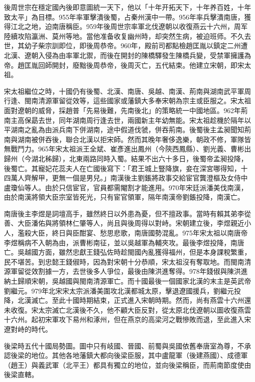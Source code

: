 後周世宗在穩定國內後即意圖統一天下，他以「十年开拓天下，十年养百姓，十年致太平」為目標。955年率軍擊潰後蜀，占秦州漢中一帶。956年率兵擊潰南唐，獲得江北之地，迫南唐稱臣。959年後周世宗率軍北伐遼朝以收復燕云十六州，周军陸續攻陷瀛洲、莫州等地。當他准备收复幽州時，却突然生病，被迫班师。不久去世，其幼子柴宗訓即位，即後周恭帝。960年，殿前司都點檢趙匡胤以鎮定二州遭北漢、遼朝入侵為由率軍北禦，而後在開封的陳橋驛發生陳橋兵變，受禁軍擁護為帝。趙匡胤回師開封，廢黜後周恭帝，後周灭亡，五代結束。他建立宋朝，即宋太祖。

宋太祖繼位之時，十國仍有後蜀、北漢、南唐、吳越、南漢、荊南與湖南武平軍周行逢、閩南清源軍留從效等，這些國家或藩鎮大多奉宋朝為宗主或臣服之。宋太祖面對遼朝的威脅，採趙普「先易後難，先南後北」的策略統一中國地區。962年荊南主高保勗去世，同年湖南周行逢去世，兩國新主年幼無能。宋太祖趁機於隔年以平湖南之亂為由派兵南下併湖南，途中假道伐虢，併吞荊南。後蜀後主孟昶聞知荊南與湖南被併吞後，聯合北漢以拒宋師。然而其晚年奢侈逸樂，朝政不修，軍隊皆無戰鬥力。965年宋太祖派王全斌、崔彥進出鳳州（今陝西鳳縣）、劉光義、曹彬出歸州（今湖北秭歸），北東兩路同時入蜀。結果不出六十多日，後蜀帝孟昶投降，後蜀亡。其寵妃花蕊夫人在亡國後寫下：「君王城上豎降旗，妾在深宮哪得知，十四萬人齊解甲，更無一個是男兒。」南漢後主劉鋹將政事交給宦官龔澄樞及女侍中盧瓊仙等人。由於只信宦官，官員都需閹割才能進用。970年宋廷派潘美伐南漢，由於南漢將領大臣宗室皆死光，只有宦官領軍，隔年南漢帝劉鋹投降，南漢亡。

南唐後主李煜是詞壇高手，雖然終日以外患為憂，但不擅政事。當時有賴其弟李從善、大臣潘佑與將領林仁肇等人，尚且與後周得以對峙。宋朝建立後，李煜親近小人，濫殺大臣，終日與臣酣宴、愁思悲歌，南唐國勢混亂。975年宋太祖以南唐帝李煜稱病不入朝為由，派曹彬南征，並以吳越軍為輔夾攻。最後李煜投降，南唐亡。吳越國方面，雖然忠獻王錢弘佐時趁閩國內亂獲得福州，但是本身課稅繁重，民不堪苦。到忠懿王錢俶時，因為對宋朝十分恭順，宋太祖沒有奪取地。而閩南清源軍留從效割據一方，去世後多人爭位，最後由陳洪進奪得。978年錢俶與陳洪進納土歸順宋朝，吳越國與閩南清源軍亡。而十國最後一個國家北漢的末主是英武帝劉繼元。979年北宋宋太宗派潘美圍攻北漢都城太原，擊退遼國援兵，劉繼元投降，北漢滅亡。至此十國時期結束，正式進入宋朝時期。然而，尚有燕雲十六州還未收復。宋太宗滅亡北漢後不久，他不顧大臣反對，從太原北伐遼朝以圖收復燕雲十六州。起初宋軍攻下易州和涿州，但在燕京的高梁河之戰慘敗而退，至此進入宋遼對峙的時代。

後梁時五代十國局勢圖。圖中只有岐國、晉國、前蜀與吳國依舊奉唐室為尊，不承認後梁的地位。其他各地藩鎮大都向後梁臣服，其中盧龍軍（後建燕國）、成德軍（趙王）與義武軍（北平王）都具有獨立的地位，並向後梁稱臣，而荊南節度使由後梁直轄。

